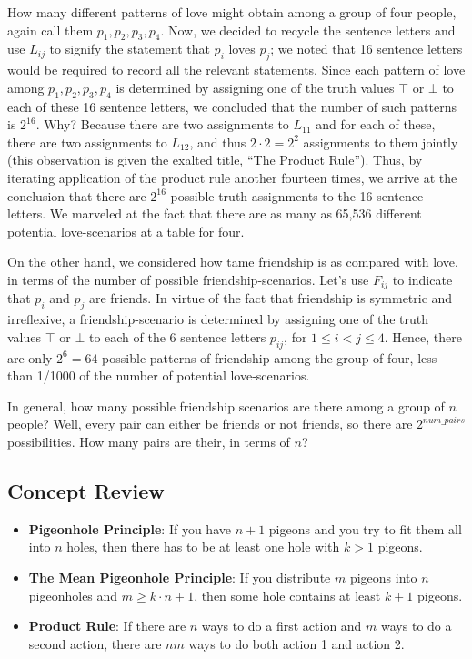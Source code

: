 How many different patterns of love might obtain among a group of four people, again call them $p_1,p_2,p_3,p_4$. Now, we decided to recycle the sentence letters and use $L_{ij}$ to signify the statement that $p_i$ loves $p_j$; we noted that 16 sentence letters would be required to record all the relevant statements. Since each pattern of love among $p_1,p_2,p_3,p_4$ is determined by assigning one of the truth values $\top$ or $\bot$ to each of these 16 sentence letters, we concluded that the number of such patterns is $2^{16}$. Why? Because there are two assignments to $L_{11}$ and for each of these, there are two assignments to $L_{12}$, and thus $2\cdot 2 = 2^2$ assignments to them jointly (this observation is given the exalted title, ``The Product Rule''). Thus, by iterating application of the product rule another fourteen times, we arrive at the conclusion that there are $2^{16}$ possible truth assignments to the 16 sentence letters. We marveled at the fact that there are as many as 65,536 different potential love-scenarios at a table for four.

On the other hand, we considered how tame friendship is as compared with love, in terms of the number of possible friendship-scenarios. Let's use $F_{ij}$ to indicate that $p_i$ and $p_j$ are friends. In virtue of the fact that friendship is symmetric and irreflexive, a friendship-scenario is determined by assigning one of the truth values $\top$ or $\bot$ to each of the 6 sentence letters $p_{ij}$, for $1\leq i < j\leq 4$. Hence, there are only $2^6=64$ possible patterns of friendship among the group of four, less than 1/1000 of the number of potential love-scenarios. 


\begin{aside}
In general, how many possible friendship scenarios are there among a group of $n$ people? Well, every pair can either be friends or not friends, so there are $2^{num\_pairs}$ possibilities. How many pairs are their, in terms of $n$? 
\end{aside}

\newpage
\begin{mdframed}[linewidth=1]
\section*{Concept Review}
\begin{itemize}
    \item \textbf{Pigeonhole Principle}: If you have $n + 1$ pigeons and you try to fit them all into $n$ holes, then there has to be at least one hole with $k > 1$ pigeons. 

    \item \textbf{The Mean Pigeonhole Principle}: If you distribute $m$ pigeons into $n$ pigeonholes and $m\geq k\cdot n +1$, then some hole contains at least $k+1$ pigeons. 

    \item \textbf{Product Rule}: If there are $n$ ways to do a first action and $m$ ways to do a second action, there are $nm$ ways to do both action 1 and action 2. 
\end{itemize}
\end{mdframed}


